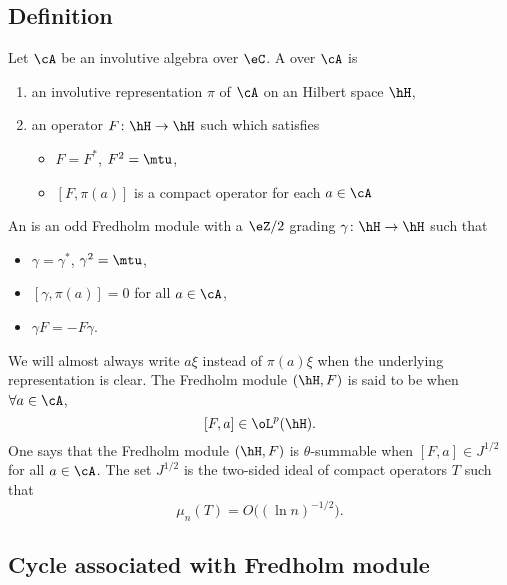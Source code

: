 \subsection{Definition}

Let $\cA$ be an involutive algebra over $\eC$. A  over $\cA$ is
\begin{enumerate}
	\item an involutive representation $\pi$ of $\cA$ on an Hilbert space $\hH$,
	\item an operator $F\colon \hH\to \hH$ such which satisfies
	      \begin{itemize}
		      \item $F=F^*$, $F^2=\mtu$,
		      \item $[F,\pi(a)]$ is a compact operator for each $a\in\cA$
	      \end{itemize}

\end{enumerate}

An  is an odd Fredholm module with a $\eZ/2$ grading $\gamma\colon \hH\to \hH$ such that
\begin{itemize}
	\item $\gamma=\gamma^*$, $\gamma^2=\mtu$,
	\item $[\gamma,\pi(a)]=0$ for all $a\in\cA$,
	\item $\gamma F=-F\gamma$.
\end{itemize}
We will almost always write $a\xi$ instead of $\pi(a)\xi$ when the underlying representation is clear. The Fredholm module $(\hH,F)$ is said to be  when $\forall a\in\cA$,
\[
	[F,a]\in\oL^p(\hH).
\]
One says that the Fredholm module $(\hH,F)$ is $\theta$-summable when $[F,a]\in J^{1/2}$ for all $a\in\cA$. The set $J^{1/2}$ is the two-sided ideal of compact operators $T$ such that
\[
	\mu_n(T)=O\big( (\ln n)^{-1/2} \big).
\]

\subsection{Cycle associated with Fredholm module}

